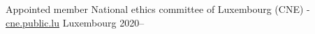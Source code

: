 

\begin{cvhonors}

  \cvhonor
    {Appointed member} %
    {National ethics committee of Luxembourg (CNE) - \href{cne.public.lu.}{cne.public.lu}} %
    {Luxembourg} %
    {2020--} %

\end{cvhonors}
